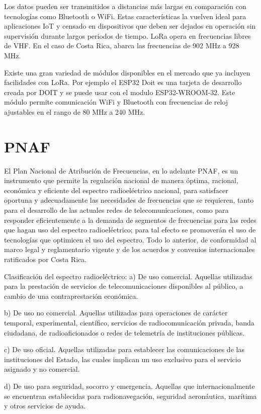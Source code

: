 \documentclass[conference]{IEEEtran}
\begin{document}
Los datos pueden ser transmitidos a distancias más largas en comparación con tecnologías como Bluetooth o WiFi. 
Estas características la vuelven ideal para aplicaciones IoT y censado en dispositivos que deben ser dejados
en operación sin supervisión durante largos periodos de tiempo. LoRa opera en frecuencias libres de VHF.
En el caso de Costa Rica, abarca las frecuencias de 902 MHz a 928 MHz.  

Existe una gran variedad de módulos disponibles en el mercado que ya incluyen facilidades con LoRa. 
Por ejemplo el ESP32 Doit es una tarjeta de desarrollo creada por DOIT y se puede usar con el modulo 
ESP32-WROOM-32. Este módulo permite comunicación WiFi y Bluetooth con frecuencias de reloj ajustables
en el rango de 80 MHz a 240 MHz. 

\section{PNAF}
El Plan Nacional de Atribución de Frecuencias, en lo adelante PNAF,
es un instrumento que permite la regulación nacional de manera óptima, racional,
económica y eficiente del espectro radioeléctrico nacional, para satisfacer oportuna y
adecuadamente las necesidades de frecuencias que se requieren,
tanto para el desarrollo de las actuales redes de telecomunicaciones,
como para responder eficientemente a la demanda de segmentos de frecuencias para las redes 
que hagan uso del espectro radioeléctrico; para tal efecto se promoverán el uso de tecnologías
que optimicen el uso del espectro. Todo lo anterior, de conformidad al marco legal y reglamentario vigente y
de los acuerdos y convenios internacionales ratificados por Costa Rica.

Clasificación del espectro radioeléctrico:
a) De uso comercial. Aquellas utilizadas para la prestación de servicios de telecomunicaciones disponibles al público,
a cambio de una contraprestación económica.

b)  De uso no comercial.  Aquellas utilizadas para operaciones de carácter temporal, experimental, científico,
servicios de radiocomunicación privada, banda ciudadana, de radioaficionados o redes de telemetría de instituciones públicas.

c) De uso oficial.  Aquellas utilizadas para establecer las comunicaciones de las instituciones del Estado,
las cuales implican un uso exclusivo para el servicio asignado y no comercial.

d) De uso para seguridad, socorro y emergencia.
Aquellas que internacionalmente se encuentran establecidas para radionavegación,
seguridad aeronáutica, marítima y otros servicios de ayuda.
\end{document}
